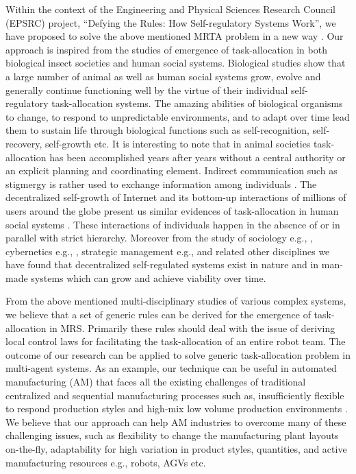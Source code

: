 Within the context of the Engineering and Physical Sciences Research Council (EPSRC) project, ``Defying the Rules: How Self-regulatory Systems Work'', we have proposed to solve the above mentioned MRTA problem in a new way \cite{Arcaute+2008}. Our approach is inspired from the studies of emergence of task-allocation in both biological insect societies and human social systems. Biological studies show that a large number of animal as well as human social systems grow, evolve and generally continue functioning well by the virtue of their individual self-regulatory task-allocation systems. The amazing abilities of biological organisms to change, to respond to unpredictable environments, and to adapt over time lead them to sustain life through biological functions such as self-recognition, self-recovery, self-growth etc. It is interesting to note that in animal societies task-allocation has been accomplished years after years without a central authority or an explicit planning and coordinating element. Indirect communication such as stigmergy is rather used to exchange information among individuals \cite{Camazine+2001}. The decentralized self-growth of Internet and its bottom-up interactions of millions of users around the globe present us similar evidences of task-allocation in human social systems \cite{Andriani+2004}. These interactions of individuals happen in the absence of or in parallel with strict hierarchy. Moreover from the study of sociology e.g., \cite{Sayer+1992}, cybernetics e.g., \cite{Beer1981}, strategic management e.g., \cite{Kogut2000} and related other disciplines we have found that decentralized self-regulated systems exist in nature and in man-made systems which can grow and achieve viability over time. 

From the above mentioned multi-disciplinary studies of various complex systems, we believe that a set of generic rules can be derived for the emergence of task-allocation in MRS. Primarily these rules should deal with the issue of deriving local control laws for facilitating the task-allocation of an entire robot team. 
The outcome of our research can be applied to solve generic task-allocation problem in multi-agent systems. As an example, our technique can be useful in automated manufacturing (AM) that faces all the existing challenges of traditional centralized and sequential manufacturing processes such as, insufficiently flexible to respond production styles and high-mix low volume production environments \cite{Shen+2006}. We believe that our approach  can help  AM industries to overcome many of these challenging issues, such as flexibility to change the manufacturing plant layouts on-the-fly, adaptability for high variation in product styles, quantities, and active manufacturing resources e.g., robots, AGVs etc.
